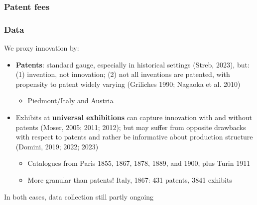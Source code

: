 \documentclass[10pt]{beamer}
\begin{document}
\begin{frame}[label = patent_fees]
    \frametitle{Patent fees}


\hyperlink{duration}{}  

\end{frame}



    
\begin{frame}
    \frametitle{Data}
    
    We proxy innovation by:

    \begin{itemize}
        \item \textbf{Patents}: standard gauge, especially in historical settings (Streb, 2023), but: (1) invention, not innovation; (2) not all inventions are patented, with propensity to patent widely varying (Griliches 1990; Nagaoka et al. 2010)
        
        \begin{itemize}
            \item Piedmont/Italy and Austria
        \end{itemize}

        \pause
        
        \item Exhibits at \textbf{universal exhibitions} can capture innovation with and without patents (Moser, 2005; 2011; 2012); but may suffer from opposite drawbacks with respect to patents and rather be informative about production structure (Domini, 2019; 2022; 2023)
         
        \begin{itemize}
            \item Catalogues from Paris 1855, 1867, 1878, 1889, and 1900, plus Turin 1911
            \item More granular than patents! Italy, 1867: 431 patents, 3841 exhibits 
        \end{itemize}

    \end{itemize}

    \bigskip
    In both cases, data collection still partly ongoing
    
\end{frame}
\end{document}
